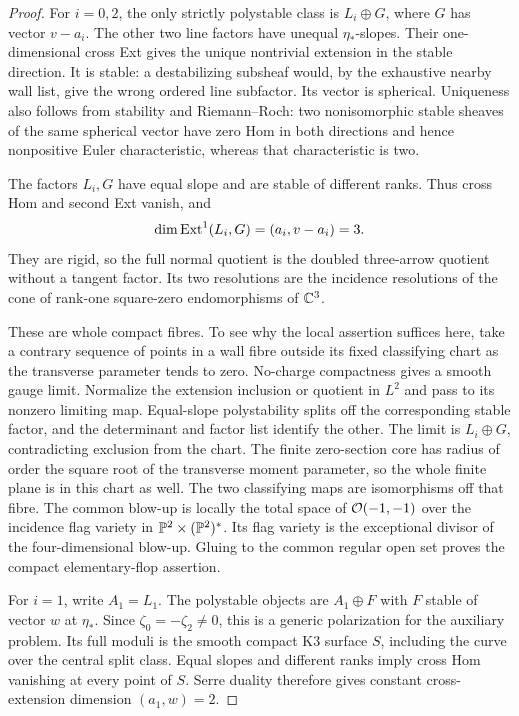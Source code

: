 \begin{proof}
For $i=0,2$, the only strictly polystable class is $L_i\oplus G$,
where $G$ has vector $v-a_i$. The other two line factors have unequal
$\eta_*$-slopes. Their one-dimensional cross Ext gives the unique
nontrivial extension in the stable direction. It is stable: a
destabilizing subsheaf would, by the exhaustive nearby wall list,
give the wrong ordered line subfactor. Its vector is spherical.
Uniqueness also follows from stability and Riemann--Roch: two
nonisomorphic stable sheaves of the same spherical vector have
zero Hom in both directions and hence nonpositive Euler
characteristic, whereas that characteristic is two.

The factors $L_i,G$ have equal slope and are stable of different
ranks. Thus cross Hom and second Ext vanish, and
\[
 \dim\operatorname{Ext}^1(L_i,G)=(a_i,v-a_i)=3.
\]
They are rigid, so the full normal quotient is the doubled
three-arrow quotient without a tangent factor. Its two resolutions
are the incidence resolutions of the cone of rank-one square-zero
endomorphisms of $\mathbb C^3$.

These are whole compact fibres. To see why the local assertion
suffices here, take a contrary sequence of points in a wall fibre
outside its fixed classifying chart as the transverse parameter
tends to zero. No-charge compactness gives a smooth gauge limit.
Normalize the extension inclusion or quotient in $L^2$ and pass to
its nonzero limiting map. Equal-slope polystability splits off the
corresponding stable factor, and the determinant and factor list
identify the other. The limit is $L_i\oplus G$, contradicting
exclusion from the chart. The finite zero-section core has radius
of order the square root of the transverse moment parameter, so
the whole finite plane is in this chart as well. The two
classifying maps are isomorphisms off that fibre. The common
blow-up is locally the total space of $\mathcal O(-1,-1)$ over the
incidence flag variety in $\mathbb P^2\times(\mathbb P^2)^*$. Its flag
variety is the exceptional divisor of the four-dimensional
blow-up. Gluing to the common regular open set proves the
compact elementary-flop assertion.

For $i=1$, write $A_1=L_1$. The polystable objects are $A_1\oplus F$
with $F$ stable of vector $w$ at $\eta_*$. Since
$\zeta_0=-\zeta_2\ne0$, this is a generic polarization for the
auxiliary problem. Its full moduli is the smooth compact K3 surface
$S$, including the curve over the central split class. Equal slopes
and different ranks imply cross Hom vanishing at every point of
$S$. Serre duality therefore gives constant cross-extension
dimension $(a_1,w)=2$.


\end{proof}
